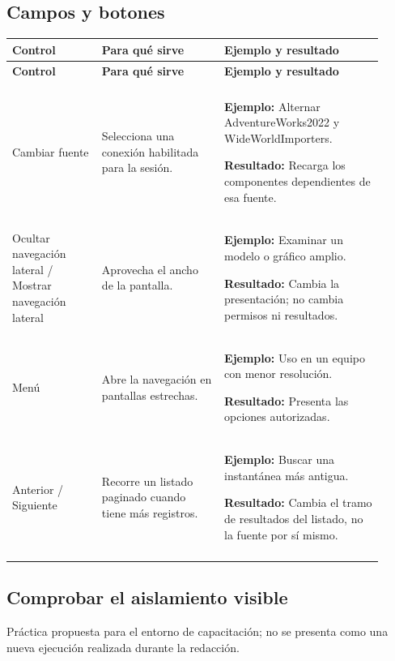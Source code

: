 \subsection{Campos y botones}
\begingroup
\fontsize{10}{12.5}\selectfont
\setlength{\tabcolsep}{5pt}
\renewcommand{\arraystretch}{1.15}
\begin{longtable}{@{}>{\RaggedRight\arraybackslash}p{0.22\linewidth}>{\RaggedRight\arraybackslash}p{0.3\linewidth}>{\RaggedRight\arraybackslash}p{0.39\linewidth}@{}}
\toprule
\textbf{Control} & \textbf{Para qué sirve} & \textbf{Ejemplo y resultado} \\
\midrule
\endfirsthead
\toprule
\textbf{Control} & \textbf{Para qué sirve} & \textbf{Ejemplo y resultado} \\
\midrule
\endhead
\midrule
\multicolumn{3}{r}{\footnotesize Continúa en la página siguiente}\\
\endfoot
\bottomrule
\endlastfoot
Cambiar fuente & Selecciona una conexión habilitada para la sesión. & \textbf{Ejemplo:} Alternar AdventureWorks2022 y WideWorldImporters.\par\smallskip\textbf{Resultado:} Recarga los componentes dependientes de esa fuente. \\
\addlinespace[3pt]
Ocultar navegación lateral / Mostrar navegación lateral & Aprovecha el ancho de la pantalla. & \textbf{Ejemplo:} Examinar un modelo o gráfico amplio.\par\smallskip\textbf{Resultado:} Cambia la presentación; no cambia permisos ni resultados. \\
\addlinespace[3pt]
Menú & Abre la navegación en pantallas estrechas. & \textbf{Ejemplo:} Uso en un equipo con menor resolución.\par\smallskip\textbf{Resultado:} Presenta las opciones autorizadas. \\
\addlinespace[3pt]
Anterior / Siguiente & Recorre un listado paginado cuando tiene más registros. & \textbf{Ejemplo:} Buscar una instantánea más antigua.\par\smallskip\textbf{Resultado:} Cambia el tramo de resultados del listado, no la fuente por sí mismo. \\
\addlinespace[3pt]
\end{longtable}
\endgroup

\subsection{Comprobar el aislamiento visible}
Práctica propuesta para el entorno de capacitación; no se presenta como una nueva ejecución realizada durante la redacción.

